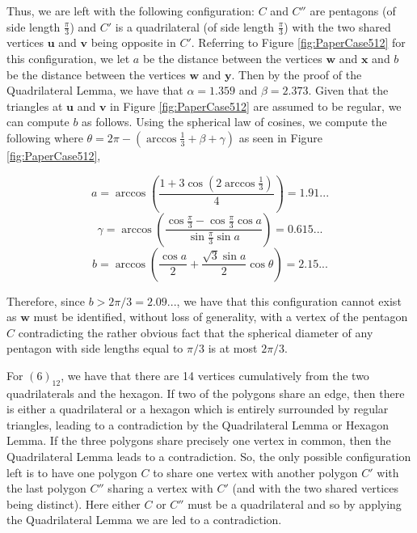 \documentclass[10pt]{article}
\numberwithin{Subcase}{Case}
\begin{document}
Thus, we are left with the following configuration: $C$ and $C''$ are pentagons (of side length $\frac{\pi}{3}$) and $C'$ is a quadrilateral (of side length $\frac{\pi}{3}$) with the two shared vertices $\mathbf u$ and $\mathbf v$ being opposite in $C'$.
Referring to Figure \ref{fig:PaperCase512} for this configuration, we let $a$ be the distance between the vertices $\mathbf w$ and $\mathbf x$ and $b$ be the distance between the vertices $\mathbf w$ and $\mathbf y$. Then by the proof of the Quadrilateral Lemma, we have that $\alpha = 1.359$ and $\beta=2.373$. Given that the triangles at $\mathbf u$ and $\mathbf v$ in Figure \ref{fig:PaperCase512} are assumed to be regular, we can compute $b$ as follows. Using the spherical law of cosines, we compute the following where $\theta = 2\pi-(\arccos\frac{1}{3}+\beta+\gamma)$ as seen in Figure \ref{fig:PaperCase512},

\begin{equation*}
a = \arccos\left(\frac{1+3\cos(2\arccos\frac{1}{3})}{4}\right) = 1.91...
\end{equation*}
\begin{equation*}
\gamma = \arccos\left(\frac{\cos\frac{\pi}{3} - \cos\frac{\pi}{3}\cos a}{\sin\frac{\pi}{3}\sin a}\right) = 0.615...
\end{equation*}
\begin{equation*}
b =\arccos\left(\frac{\cos a}{2}+\frac{\sqrt{3}\sin a}{2}\cos \theta\right) = 2.15...
\end{equation*}

Therefore, since $b > 2\pi/3 = 2.09...$, we have that this configuration cannot exist as $\mathbf w$ must be identified, without loss of generality, with a vertex of the pentagon $C$ contradicting 
the rather obvious fact that the spherical diameter of any pentagon with side lengths equal to $\pi/3$ is at most $2\pi/3$.

For $(6)_{12}$, we have that there are 14 vertices cumulatively from the two quadrilaterals and the hexagon. If two of the polygons share an edge, then there is either a quadrilateral or a hexagon which is entirely surrounded by regular triangles, leading to a contradiction by the Quadrilateral Lemma or Hexagon Lemma. If the three polygons share precisely one vertex in common, then the Quadrilateral Lemma leads to a contradiction. So, the only possible configuration left is to have one polygon $C$ to share one vertex with another polygon $C'$ with the last polygon $C''$ sharing a vertex with $C'$ (and with the two shared vertices being distinct). Here either $C$ or $C''$ must be a quadrilateral and so by applying the Quadrilateral Lemma we are led to a contradiction.
\end{document}
